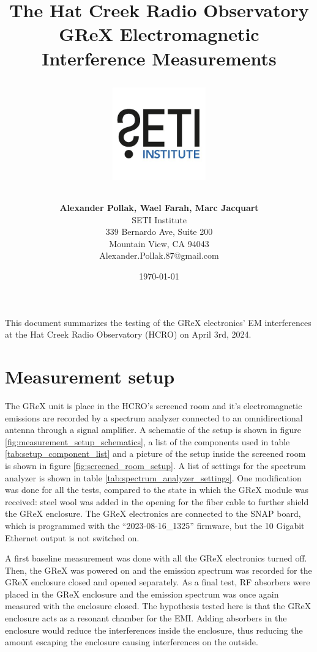 \documentclass[12pt,a4paper,oneside]{article}
\title{\Huge The Hat Creek Radio Observatory\\
\vspace{0.5cm}
GReX Electromagnetic Interference Measurements\\
\vspace{0.5cm}
\normalsize \emph{}
\vspace{3.5cm}
\begin{center}
\includegraphics[height=4cm]{Figures/SETI_institute_logo.jpg}
\end{center}
}
\author{ 
\vspace{1cm}
\Large
\textbf{Alexander Pollak, Wael Farah, Marc Jacquart} \\
SETI Institute \\ 
339 Bernardo Ave, Suite 200 \\
Mountain View, CA 94043 \\ 
Alexander.Pollak.87@gmail.com\\
}
\date{\today}
\begin{document}
\clearpage\maketitle
\thispagestyle{empty}

\newpage


This document summarizes the testing of the GReX electronics' EM interferences at the Hat Creek Radio Observatory (HCRO) on April 3rd, 2024.

\section{Measurement setup}
\label{sec:Testing}

The GReX unit is place in the HCRO's screened room and it's electromagnetic emissions are recorded by a spectrum analyzer connected to an omnidirectional antenna through a signal amplifier. A schematic of the setup is shown in figure \ref{fig:measurement_setup_schematics}, a list of the components used in table \ref{tab:setup_component_list} and a picture of the setup inside the screened room is shown in figure \ref{fig:screened_room_setup}. A list of settings for the spectrum analyzer is shown in table \ref{tab:spectrum_analyzer_settings}. One modification was done for all the tests, compared to the state in which the GReX module was received: steel wool was added in the opening for the fiber cable to further shield the GReX enclosure. The GReX electronics are connected to the SNAP board, which is programmed with the ``2023-08-16\_1325'' firmware, but the 10 Gigabit Ethernet output is not switched on.

A first baseline measurement was done with all the GReX electronics turned off. Then, the GReX was powered on and the emission spectrum was recorded for the GReX enclosure closed and opened separately. As a final test, RF absorbers were placed in the GReX enclosure and the emission spectrum was once again measured with the enclosure closed. The hypothesis tested here is that the GReX enclosure acts as a resonant chamber for the EMI. Adding absorbers in the enclosure would reduce the interferences inside the enclosure, thus reducing the amount escaping the enclosure causing interferences on the outside.
\end{document}
